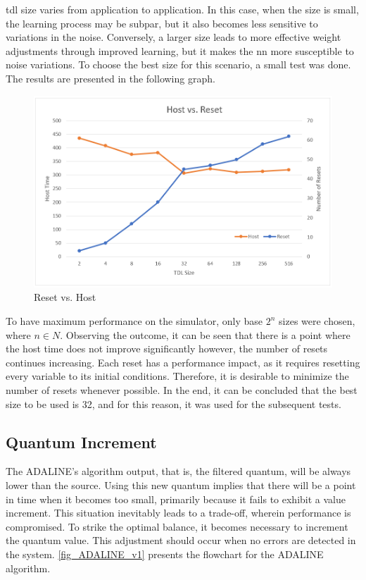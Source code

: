 \gls{tdl} size varies from application to application. In this case, when the size is small, the learning process may be subpar, but it also 
becomes less sensitive to variations in the noise. Conversely, a larger size leads to more effective weight adjustments through improved learning, 
but it makes the \gls{nn} more susceptible to noise variations. To choose the best size for this scenario, a small test was done. The results are 
presented in the following graph.

\begin{figure}[H]
	\centering
 	\includegraphics[width=0.7\linewidth]{Images/ResetVsHost.png}
 	\caption{Reset vs. Host}
	 \label{fig_ResetVsHost}
\end{figure}

To have maximum performance on the simulator, only base $2^{n}$ sizes were chosen, where $n \in N$. Observing the outcome, it can be seen that 
there is a point where the host time does not improve significantly however, the number of resets continues increasing. Each reset has a 
performance impact, as it requires resetting every variable to its initial conditions. Therefore, it is desirable to minimize the number of 
resets whenever possible. In the end, it can be concluded that the best size to be used is 32, and for this reason, it was used for the subsequent 
tests.

\subsection{Quantum Increment}

The ADALINE's algorithm output, that is, the filtered quantum, will be always lower than the source. Using this new quantum implies that there will 
be a point in time when it becomes too small, primarily because it fails to exhibit a value increment. This situation inevitably leads to a 
trade-off, wherein performance is compromised. To strike the optimal balance, it becomes necessary to increment the quantum value. This adjustment 
should occur when no errors are detected in the system. \autoref{fig_ADALINE_v1} presents the flowchart for the ADALINE algorithm.

